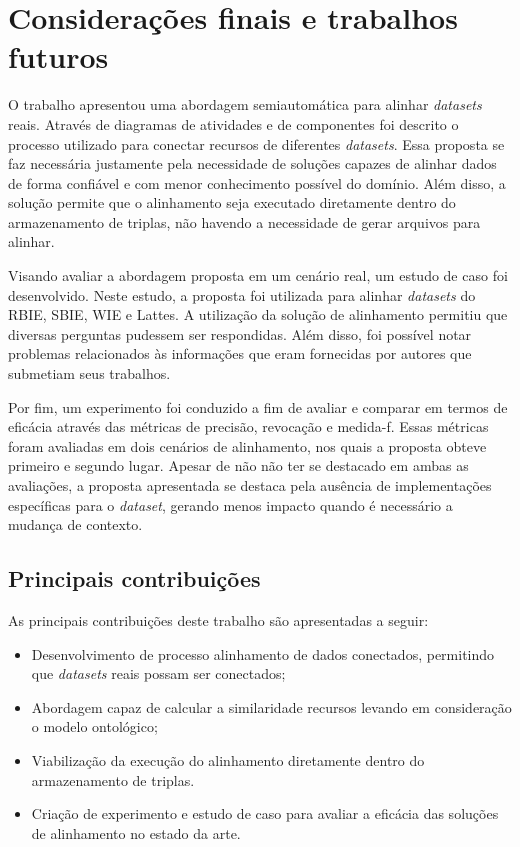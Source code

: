 \chapter{Considerações finais e trabalhos futuros}
\label{cap:conclusao}
O trabalho apresentou uma abordagem semiautomática para alinhar \textit{datasets} reais. Através de diagramas de atividades e de componentes foi descrito o processo utilizado para conectar recursos de diferentes \textit{datasets}. Essa proposta se faz necessária justamente pela necessidade de soluções capazes de alinhar dados de forma confiável e com menor conhecimento possível do domínio. Além disso, a solução permite que o alinhamento seja executado diretamente dentro do armazenamento de triplas, não havendo a necessidade de gerar arquivos para alinhar. 

Visando avaliar a abordagem proposta em um cenário real, um estudo de caso foi desenvolvido. Neste estudo, a proposta foi utilizada para alinhar \textit{datasets} do RBIE, SBIE, WIE e Lattes. A utilização da solução de alinhamento permitiu que diversas perguntas pudessem ser respondidas. Além disso, foi possível notar problemas relacionados às informações que eram fornecidas por autores que submetiam seus trabalhos.

Por fim, um experimento foi conduzido  a fim de avaliar e comparar em termos de eficácia através das métricas de precisão, revocação e medida-f. Essas métricas foram avaliadas em dois cenários de alinhamento, nos quais a proposta obteve primeiro e segundo lugar. Apesar de não não ter se destacado em ambas as avaliações, a proposta apresentada se destaca pela ausência de implementações específicas para o \textit{dataset}, gerando menos impacto quando é necessário a mudança de contexto.

\section{Principais contribuições}
As principais contribuições deste trabalho são apresentadas a seguir:
\begin{itemize}
\item Desenvolvimento de processo alinhamento de dados conectados, permitindo que \textit{datasets} reais possam ser conectados;
\item Abordagem capaz de calcular a similaridade  recursos levando em consideração o modelo ontológico;
\item Viabilização da execução do alinhamento diretamente dentro do armazenamento de triplas.
\item  Criação de experimento e estudo de caso para avaliar a eficácia das soluções de alinhamento no estado da arte.
\end{itemize}

